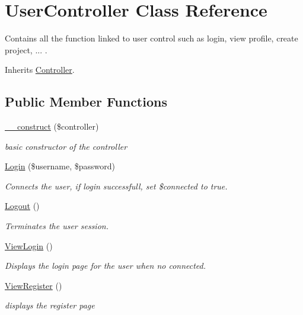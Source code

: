 \hypertarget{class_user_controller}{}\section{User\+Controller Class Reference}
\label{class_user_controller}


Contains all the function linked to user control such as login, view profile, create project, ... .  




Inherits \hyperlink{class_controller}{Controller}.

\subsection*{Public Member Functions}
\begin{DoxyCompactItemize}
\item 
\hyperlink{class_user_controller_ad717f2a6a729542cf8f99500814c6cec}{\+\_\+\+\_\+construct} (\$controller)
\begin{DoxyCompactList}\small\item\em basic constructor of the controller \end{DoxyCompactList}\item 
\hyperlink{class_user_controller_a4a533e4b69f7790e6b74bff620275edc}{Login} (\$username, \$password)
\begin{DoxyCompactList}\small\item\em Connects the user, if login successfull, set \$connected to true. \end{DoxyCompactList}\item 
\hyperlink{class_user_controller_aa14f760d541a59acb41ac8eefddafb9b}{Logout} ()
\begin{DoxyCompactList}\small\item\em Terminates the user session. \end{DoxyCompactList}\item 
\hyperlink{class_user_controller_a8790b12a85714a69e244b9a2356014c4}{View\+Login} ()
\begin{DoxyCompactList}\small\item\em Displays the login page for the user when no connected. \end{DoxyCompactList}\item 
\hyperlink{class_user_controller_a4b78247221086a92c1688dbba1f5c6b7}{View\+Register} ()
\begin{DoxyCompactList}\small\item\em displays the register page \end{DoxyCompactList}\item 

\end{DoxyCompactItemize}
